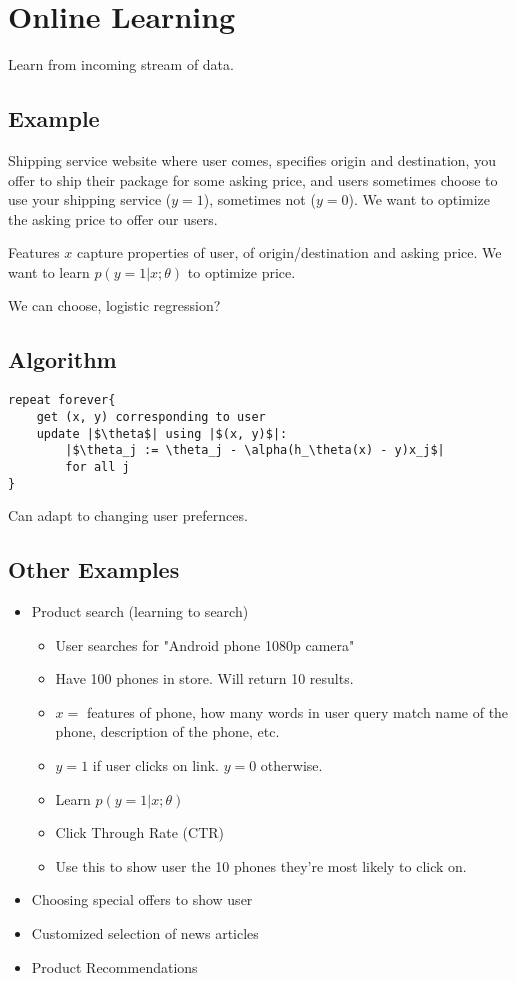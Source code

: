 \section{Online Learning}
Learn from incoming stream of data.

\subsection{Example} Shipping service website where user comes, specifies origin and
destination, you offer to ship their package for some asking price, and users
sometimes choose to use your shipping service ($y = 1$), sometimes not ($y = 0$).
We want to optimize the asking price to offer our users.

Features $x$ capture
properties of user, of origin/destination and asking price. We want to learn
$p(y = 1|x;\theta)$ to optimize price.

We can choose, logistic regression?

\subsection{Algorithm}
\begin{verbatim}
repeat forever{
	get (x, y) corresponding to user
	update |$\theta$| using |$(x, y)$|:
		|$\theta_j := \theta_j - \alpha(h_\theta(x) - y)x_j$|
		for all j
}
\end{verbatim}

\begin{remark}
	Can adapt to changing user prefernces.
\end{remark}

\subsection{Other Examples}
\begin{itemize}
	\item Product search (learning to search) \begin{itemize}
		      \item User searches for "Android phone 1080p camera"
		      \item Have 100 phones in store. Will return 10 results.
		      \item $x = $ features of phone, how many words in user query match
		            name of the phone, description of the phone, etc.
		      \item $y = 1$ if user clicks on link. $y = 0$ otherwise.
		      \item Learn $p(y = 1|x; \theta)$
		      \item Click Through Rate (CTR)
		      \item Use this to show user the 10 phones they're most likely
		            to click on.
	      \end{itemize}
	\item Choosing special offers to show user
	\item Customized selection of news articles
	\item Product Recommendations
\end{itemize}


